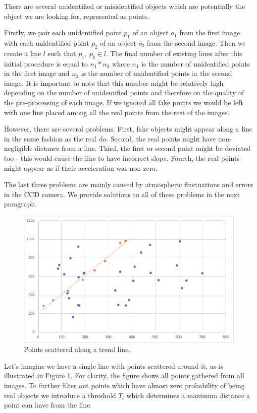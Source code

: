 	There are several unidentified or misidentified objects which are potentially the object we are looking for, represented as points. 
	
	Firstly, we pair each unidentified point $p_1$ of an object $o_1$ from the first image with each unidentified point $p_2$ of an object $o_2$ from the second image. Then we create a line $l$ such that $p_1,\ p_2 \in l$. The final number of existing lines after this initial procedure is equal to $n_1 * n_2$ where $n_1$ is the number of unidentified points in the first image and $n_2$ is the number of unidentified points in the second image. It is important to note that this number might be relatively high depending on the number of unidentified points and therefore on the quality of the pre-processing of each image. If we ignored all fake points we would be left with one line placed among all the real points from the rest of the images.
	
	However, there are several problems. First, fake objects might appear along a line in the same fashion as the real do. Second, the real points might have non-negligible distance from a line. Third, the first or second point might be deviated too - this would cause the line to have incorrect slope. Fourth, the real points might appear as if their acceleration was non-zero. 
	
	The last three problems are mainly caused by atmospheric fluctuations and errors in the CCD camera. We provide solutions to all of these problems in the next paragraph.
	
	\begin{figure}[H]
	\centering
	  \includegraphics[width=12cm]{images/regresia1}
		  \caption{Points scattered along a trend line.}
	  \label{fig:regresia1}
	\end{figure}
	
	Let's imagine we have a single line with points scattered around it, as is illustrated in Figure \ref{fig:regresia1}. For clarity, the figure shows all points gathered from all images. To further filter out points which have almost zero probability of being real objects we introduce a threshold $T_l$ which determines a maximum distance a point can have from the line. 
	
